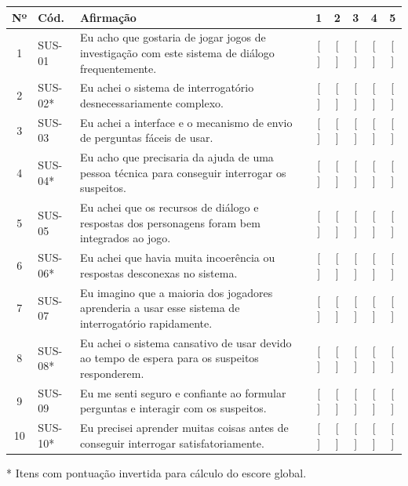 \begin{center}
\small
\renewcommand{\arraystretch}{0.92}
\label{tab:itens_sus}
\begin{tabularx}{\textwidth}{clXccccc}
\toprule
\textbf{Nº} & \textbf{Cód.} & \textbf{Afirmação} & \textbf{1} & \textbf{2} & \textbf{3} & \textbf{4} & \textbf{5} \\
\midrule
1 & SUS-01 & Eu acho que gostaria de jogar jogos de investigação com este sistema de diálogo frequentemente. & [ ] & [ ] & [ ] & [ ] & [ ] \\
2 & SUS-02* & Eu achei o sistema de interrogatório desnecessariamente complexo. & [ ] & [ ] & [ ] & [ ] & [ ] \\
3 & SUS-03 & Eu achei a interface e o mecanismo de envio de perguntas fáceis de usar. & [ ] & [ ] & [ ] & [ ] & [ ] \\
4 & SUS-04* & Eu acho que precisaria da ajuda de uma pessoa técnica para conseguir interrogar os suspeitos. & [ ] & [ ] & [ ] & [ ] & [ ] \\
5 & SUS-05 & Eu achei que os recursos de diálogo e respostas dos personagens foram bem integrados ao jogo. & [ ] & [ ] & [ ] & [ ] & [ ] \\
6 & SUS-06* & Eu achei que havia muita incoerência ou respostas desconexas no sistema. & [ ] & [ ] & [ ] & [ ] & [ ] \\
7 & SUS-07 & Eu imagino que a maioria dos jogadores aprenderia a usar esse sistema de interrogatório rapidamente. & [ ] & [ ] & [ ] & [ ] & [ ] \\
8 & SUS-08* & Eu achei o sistema cansativo de usar devido ao tempo de espera para os suspeitos responderem. & [ ] & [ ] & [ ] & [ ] & [ ] \\
9 & SUS-09 & Eu me senti seguro e confiante ao formular perguntas e interagir com os suspeitos. & [ ] & [ ] & [ ] & [ ] & [ ] \\
10 & SUS-10* & Eu precisei aprender muitas coisas antes de conseguir interrogar satisfatoriamente. & [ ] & [ ] & [ ] & [ ] & [ ] \\
\bottomrule
\end{tabularx}
\footnotesize{* Itens com pontuação invertida para cálculo do escore global.}
\end{center}

\vspace{0.05cm}


